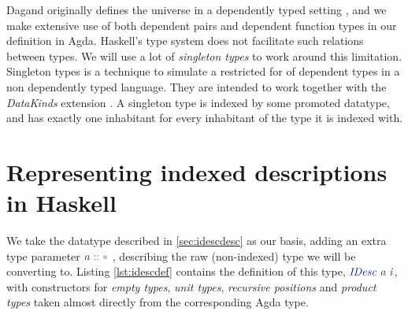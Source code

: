 \documentclass[a4paper,msc,twosized=semi]{uustthesis}
\let\oldemph\emph
\renewcommand\emph[1]{{\large\oldemph{#1}}}
\newcommand*{\mathcolor}{}
\def\mathcolor#1#{\mathcoloraux{#1}}
\newcommand*{\mathcoloraux}[3]{%
  \protect\leavevmode
  \begingroup
    \color#1{#2}#3%
  \endgroup
}
\newcommand{\HSSym}[1]{\mathcolor{hsblue4}{#1}}
\newcommand{\HSCon}[1]{\mathcolor{hsblue3}{\mathit{#1}}}
\newcommand{\HSVar}[1]{\mathcolor{hsblue5}{\mathit{#1}}}
\begin{document}
Dagand originally defines the universe in a dependently typed setting \cite
{dagand2013cosmology}, and we make extensive use of both dependent pairs and dependent 
function types in our definition in Agda. Haskell's type system does not facilitate 
such relations between types. We will use a lot of \emph{singleton types} \cite
{eisenberg2013dependently} to work around this limitation. Singleton types is a 
technique to simulate a restricted for of dependent types in a non dependently typed 
language. They are intended to work together with the \emph{DataKinds} extension \cite
{ghcdocsdatakinds}. A singleton type is indexed by some promoted datatype, and has 
exactly one inhabitant for every inhabitant of the type it is indexed with.   

\section{Representing indexed descriptions in Haskell}

  We take the datatype described in \cref{sec:idescdesc} as our basis, adding an extra 
  type parameter \ensuremath{\HSVar{a}\HSSym{::}\HSSym{*}} , describing the raw (non-indexed) type we will be 
  converting to. Listing \ref{lst:idescdef} contains the definition of this type, \ensuremath{\HSCon{IDesc}\;\HSVar{a}\;\HSVar{i}}, with constructors for \emph{empty types}, \emph{unit types}, \emph{recursive 
  positions} and \emph{product types} taken almost directly from the corresponding 
  Agda type. 
\end{document}
